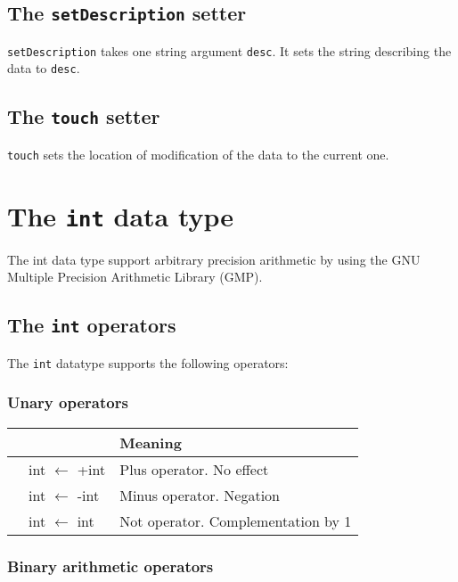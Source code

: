 \documentclass[10pt,openright,twosides]{report}
\newcommand{\gtltype}[1]{{\small\ttfamily #1}}
\newcommand{\gtlinline}[1]{\colorbox{light-blue}{\lstinline[language=gtl]{#1}}}
\begin{document}
\subsection{The \texttt{setDescription} setter} 
\label{sec:setDescription}

\gtlinline{setDescription} takes one string argument \lstinline[language=gtl]{desc}. It sets the string describing the data to \lstinline[language=gtl]{desc}.

\subsection{The \texttt{touch} setter} 
\label{sec:touch}

\gtlinline{touch} sets the location of modification of the data to the current one.

\section{The \texttt{int} data type}

The \gtltype{int} data type support arbitrary precision arithmetic by using the GNU Multiple Precision Arithmetic Library (GMP).

\subsection{The \texttt{int} operators}

The \lstinline{int} datatype supports the following operators:

\subsubsection{Unary operators}

\begin{longtable}{>{\ttfamily}l|>{\ttfamily}l|l}
{\bf Operator}&{\bf Expression type}&{\bf Meaning}\\
\hline\endhead
 {+}&
  {int $\leftarrow$ +int}&
  {Plus operator. No effect}\\
 {-}&
  {int $\leftarrow$ -int}&
  {Minus operator. Negation}\\
 {\raisebox{-1.2mm}{\textasciitilde}}&
  {int $\leftarrow$ \raisebox{-1.2mm}{\textasciitilde}int}&
  {Not operator. Complementation by 1}\\
\end{longtable}

\subsubsection{Binary arithmetic operators}
\end{document}
